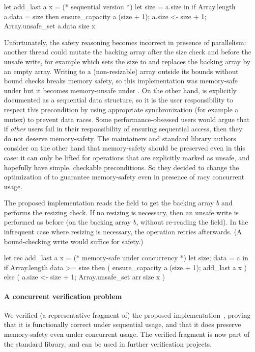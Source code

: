 \begin{ocamlcode}
let add_last a x = (* sequential version *)
  let size = a.size in
  if Array.length a.data = size then ensure_capacity a (size + 1);
  a.size <- size + 1;
  Array.unsafe_set a.data size x
\end{ocamlcode}

Unfortunately, the safety reasoning becomes incorrect in presence of parallelism: another thread could mutate the backing array after the size check and before the unsafe write, for example  which sets the size to  and replaces the backing array by an empty array.
Writing to a (non-resizable) array outside its bounds without bound checks breaks memory safety, so this implementation was memory-safe under \OCamlFour but it becomes memory-unsafe under \OCamlFive. On the other hand,  is explicitly documented as a sequential data structure, so it is the user responsibility to respect this precondition by using appropriate synchronization (for example a mutex) to prevent data races. Some performance-obsessed users would argue that if \emph{other} users fail in their responsibility of ensuring sequential access, then they do not deserve memory-safety. The \OCaml maintainers and standard library authors consider on the other hand that memory-safety should be preserved even in this case: it can only be lifted for operations that are explicitly marked as unsafe, and hopefully have simple, checkable preconditions. So they decided to change the optimization of  to guarantee memory-safety even in presence of racy concurrent usage.

The proposed implementation reads the  field to get the backing array $b$ and performs the resizing check. If no resizing is necessary, then an unsafe write is performed as before (on the backing array $b$, without re-reading the  field). In the infrequent case where resizing is necessary, the operation retries afterwards. (A bound-checking write would suffice for safety.)

\begin{ocamlcode}
let rec add_last a x = (* memory-safe under concurrency *)
  let {size; data} = a in
  if Array.length data >= size
  then ( ensure_capacity a (size + 1); add_last a x )
  else ( a.size <- size + 1; Array.unsafe_set arr size x )
\end{ocamlcode}

\paragraph{A concurrent verification problem} We verified (a representative fragment of) the proposed  implementation~, proving that it is functionally correct under sequential usage, and that it does preserve memory-safety even under concurrent usage. The verified fragment is now part of the \Zoo standard library, and can be used in further verification projects.

